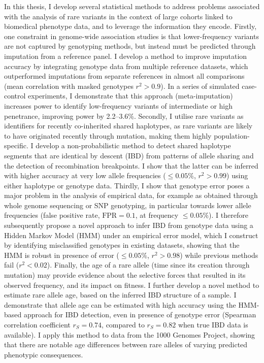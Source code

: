 In this thesis, I develop several statistical methods to address problems associated with the analysis of rare variants in the context of large cohorts linked to biomedical phenotype data, and to leverage the information they encode.
Firstly, one constraint in genome-wide association studies is that lower-frequency variants are not captured by genotyping methods, but instead must be predicted through imputation from a reference panel.
I develop a method to improve imputation accuracy by integrating genotype data from multiple reference datasets, which outperformed imputations from separate references in almost all comparisons (mean correlation with masked genotypes ${r^2 > 0.9}$).
In a series of simulated case-control experiments, I demonstrate that this approach (meta-imputation) increases power to identify low-frequency variants of intermediate or high penetrance, improving power by 2.2--3.6\%.
Secondly, I utilise rare variants as identifiers for recently co-inherited shared haplotypes, as rare variants are likely to have originated recently through mutation, making them highly population-specific.
I develop a non-probabilistic method to detect shared haplotype segments that are identical by descent (IBD) from patterns of allele sharing and the detection of recombination breakpoints.
I show that the latter can be inferred with higher accuracy at very low allele frequencies (${\leq 0.05\%}$, ${r^2 > 0.99}$) using either haplotype or genotype data.
Thirdly, I show that genotype error poses a major problem in the analysis of empirical data, for example as obtained through whole genome sequencing or SNP genotyping, in particular towards lower allele frequencies (false positive rate, ${\text{FPR}=0.1}$, at frequency ${\leq 0.05\%}$).
I therefore subsequently propose a novel approach to infer IBD from genotype data using a Hidden Markov Model (HMM) under an empirical error model, which I construct by identifying misclassified genotypes in existing datasets, showing that the HMM is robust in presence of error (${\leq 0.05\%}$, ${r^2 > 0.98}$) while previous methods fail (${r^2 < 0.02}$).
Finally, the age of a rare allele (time since its creation through mutation) may provide evidence about the selective forces that resulted in its observed frequency, and its impact on fitness.
I further develop a novel method to estimate rare allele age, based on the inferred IBD structure of a sample.
I demonstrate that allele age can be estimated with high accuracy using the HMM-based approach for IBD detection, even in presence of genotype error (Spearman correlation coefficient ${r_S = 0.74}$, compared to ${r_S = 0.82}$ when true IBD data is available).
I apply this method to data from the 1000 Genomes Project, showing that there are notable age differences between rare alleles of varying predicted phenotypic consequences.




